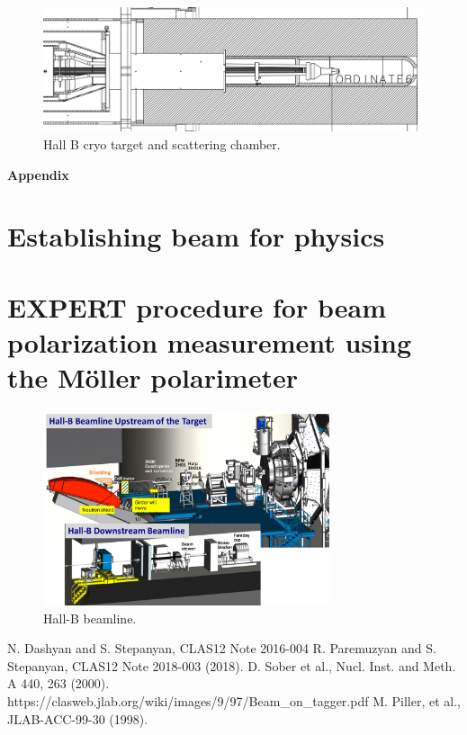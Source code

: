 \documentclass[12pt]{article}
\begin{document}
\begin{figure}[ht!]
\centering
\includegraphics[width=1.\textwidth]{target.pdf}
\caption{Hall B cryo target and scattering chamber. }%
\label{target}
\end{figure}

\clearpage

\begin{flushleft}
{\bf {\Large Appendix}}
\end{flushleft}

\section {Establishing beam for physics}


\section{EXPERT procedure for beam polarization measurement using the M{\"o}ller polarimeter}


\begin{figure}[htb]
\centering
\includegraphics[angle=90,width=0.75\textwidth]{beamline_rendaring.pdf}
\caption{Hall-B beamline.}
\label{fig:bline}
\end{figure}


\begin{thebibliography}{00}
 N. Dashyan and S. Stepanyan, CLAS12 Note 2016-004
 R. Paremuzyan and S. Stepanyan, CLAS12 Note 2018-003 (2018).
 D. Sober et al., Nucl. Inst. and Meth. A 440, 263 (2000).
 https://clasweb.jlab.org/wiki/images/9/97/Beam\_on\_tagger.pdf
 M. Piller, et al., JLAB-ACC-99-30 (1998).
\end{thebibliography}


%
\end{document}
